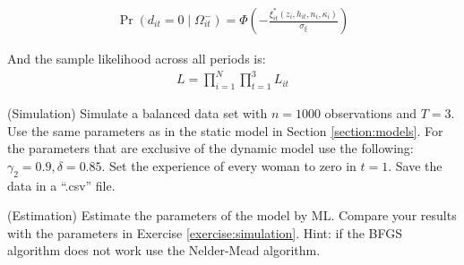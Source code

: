 \begin{eqnarray*}
\Pr \left(d_{it} = 0 \middle| \Omega_{it}^- \right) = \Phi\left(- \frac{\xi_{it}^* \left(z_i, h_{it}, n_i, \kappa_i \right)}{\sigma_\xi} \right)
\end{eqnarray*}

\noindent And the sample likelihood across all periods is:
\begin{eqnarray*}
L = \prod_{i=1}^N \prod_{t=1}^3 L_{it}
\end{eqnarray*}

\begin{exercise} (Simulation) \label{exercise:simulation}
Simulate a balanced data set with $n = 1000$ observations and $T=3$. Use the same parameters as in the static model in Section \ref{section:models}. For the parameters that are exclusive of the dynamic model use the following: $\gamma_2 = 0.9,\delta = 0.85$. Set the experience of every woman to zero in $t=1$. Save the data in a ``.csv'' file.
\end{exercise}

\begin{exercise} (Estimation)
Estimate the parameters of the model by ML. Compare your results with the parameters in Exercise \ref{exercise:simulation}. Hint: if the BFGS algorithm does not work use the Nelder-Mead algorithm.
\end{exercise} 
